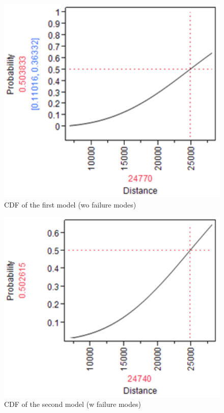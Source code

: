 \documentclass{article}
\begin{document}
\begin{enumerate}
\begin{enumerate}
  \begin{center}
        \FloatBarrier
      \begin{figure}
        \centering
        \includegraphics[width = 5in]{problem5_fit_dist1.png}
        \caption{CDF of the first model (wo failure modes)}
      \end{figure}
      \FloatBarrier
  \end{center}
  
  \begin{center}
        \FloatBarrier
      \begin{figure}
        \centering
        \includegraphics[width = 5in]{problem5_fit_dist2.png}
        \caption{CDF of the second model (w failure modes)}
      \end{figure}
      \FloatBarrier
  \end{center}
 

\end{enumerate}
\end{enumerate}
\end{document}
